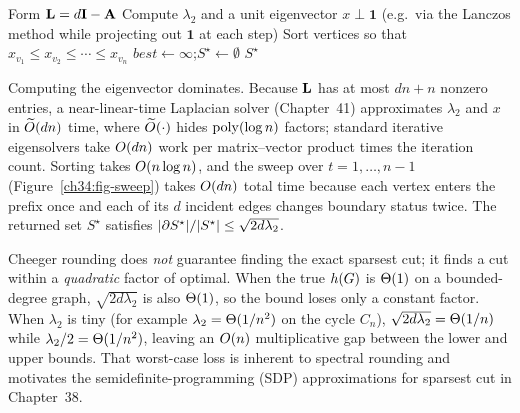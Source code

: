 \begin{algorithm}[htbp]
\caption{Spectral partitioning / Cheeger rounding}
\label{ch34:alg-cheeger}
Form $\mathbf{L}=d\mathbf{I}-\mathbf{A}$\;
Compute $\lambda_2$ and a unit eigenvector $x\perp\mathbf{1}$ (e.g.\ via the Lanczos method while projecting out $\mathbf{1}$ at each step)\;
Sort vertices so that $x_{v_1}\le x_{v_2}\le\cdots\le x_{v_n}$\;
$\mathit{best}\gets\infty$;\quad $S^\star\gets\emptyset$\;
\Return $S^\star$\;
\end{algorithm}

\begin{complexitybox}
Computing the eigenvector dominates. Because $\mathbf{L}$ has at most $dn+n$ nonzero entries, a near-linear-time Laplacian solver (Chapter~41) approximates $\lambda_2$ and $x$ in $\widetilde{O}(dn)$ time, where $\widetilde{O}(\cdot)$ hides $\operatorname{poly}(\log n)$ factors; standard iterative eigensolvers take $O(dn)$ work per matrix--vector product times the iteration count. Sorting takes $O(n\log n)$, and the sweep over $t=1,\dots,n-1$ (Figure~\ref{ch34:fig-sweep}) takes $O(dn)$ total time because each vertex enters the prefix once and each of its $d$ incident edges changes boundary status twice. The returned set $S^\star$ satisfies $\lvert\partial S^\star\rvert/\lvert S^\star\rvert\le\sqrt{2d\lambda_2}$.
\end{complexitybox}

\begin{trapbox}
Cheeger rounding does \emph{not} guarantee finding the exact sparsest cut; it finds a cut within a \emph{quadratic} factor of optimal. When the true $h(G)$ is $\Theta(1)$ on a bounded-degree graph, $\sqrt{2d\lambda_2}$ is also $\Theta(1)$, so the bound loses only a constant factor. When $\lambda_2$ is tiny (for example $\lambda_2=\Theta(1/n^2)$ on the cycle $C_n$), $\sqrt{2d\lambda_2}=\Theta(1/n)$ while $\lambda_2/2=\Theta(1/n^2)$, leaving an $O(n)$ multiplicative gap between the lower and upper bounds. That worst-case loss is inherent to spectral rounding and motivates the semidefinite-programming (SDP) approximations for sparsest cut in Chapter~38.
\end{trapbox}

